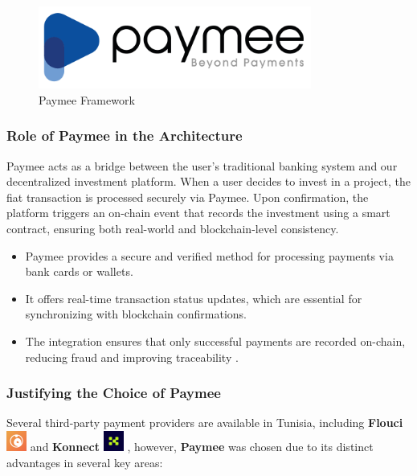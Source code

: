 \begin{figure}[htbp]
\centering
\includegraphics[width=0.8\textwidth]{images/paymee_framework.png}
\caption{Paymee Framework}
\label{fig:paymee-framework}
\end{figure}

\subsubsection{Role of Paymee in the Architecture}

Paymee acts as a bridge between the user's traditional banking system and our decentralized investment platform. When a user decides to invest in a project, the fiat transaction is processed securely via Paymee. Upon confirmation, the platform triggers an on-chain event that records the investment using a smart contract, ensuring both real-world and blockchain-level consistency.

\begin{itemize}
    \item Paymee provides a secure and verified method for processing payments via bank cards or wallets.
    \item It offers real-time transaction status updates, which are essential for synchronizing with blockchain confirmations.
    \item The integration ensures that only successful payments are recorded on-chain, reducing fraud and improving traceability \cite{Bamakan2020BlockchainPayment}.
\end{itemize}

\subsubsection{Justifying the Choice of Paymee}

Several third-party payment providers are available in Tunisia, including  \textbf{Flouci} \includegraphics[width=0.05\textwidth]{images/icons/flouci_icon.png} and  \textbf{Konnect} \includegraphics[width=0.05\textwidth]{images/icons/konnect_icon.png} , however, \textbf{Paymee} was chosen due to its distinct advantages in several key areas:

